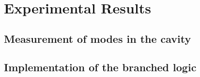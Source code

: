 \chapter{Experimental Results}
\section{Measurement of modes in the cavity}
\section{Implementation of the branched logic}